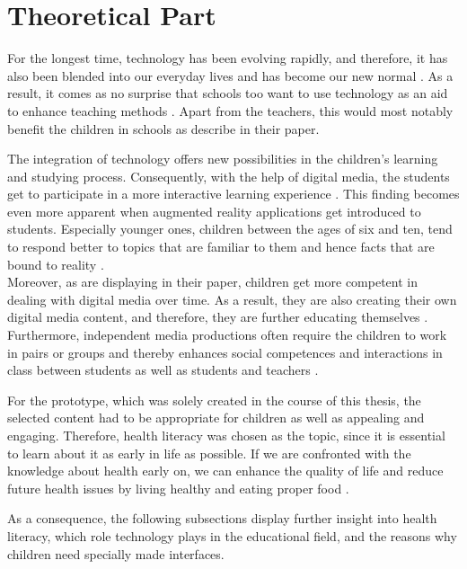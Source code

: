 \section{Theoretical Part}
\label{section:TheoreticalPart}
For the longest time, technology has been evolving rapidly, and therefore, it has also been blended into our everyday lives and has become our new normal \autocite{walker2000screen, sharmin2012effect}. As a result, it comes as no surprise that schools too want to use technology as an aid to enhance teaching methods \autocite{gan2015enhancing, lozano2016dedigitalizing}. Apart from the teachers, this would most notably benefit the children in schools as \textcite{gan2015enhancing} describe in their paper. 

The integration of technology offers new possibilities in the children's learning and studying process. Consequently, with the help of digital media, the students get to participate in a more interactive learning experience \autocite{gan2015enhancing}. This finding becomes even more apparent when augmented reality applications get introduced to students. Especially younger ones, children between the ages of six and ten, tend to respond better to topics that are familiar to them and hence facts that are bound to reality \autocite{gossen2012search, kermani2015preparing}.\\
Moreover, as \textcite{cabero2016educational} are displaying in their paper, children get more competent in dealing with digital media over time. As a result, they are also creating their own digital media content, and therefore, they are further educating themselves \autocite{cabero2016educational}. Furthermore, independent media productions often require the children to work in pairs or groups and thereby enhances social competences and interactions in class between students as well as students and teachers \autocite{cabero2016educational}. 

For the prototype, which was solely created in the course of this thesis, the selected content had to be appropriate for children as well as appealing and engaging. Therefore, health literacy was chosen as the topic, since it is essential to learn about it as early in life as possible. If we are confronted with the knowledge about health early on, we can enhance the quality of life and reduce future health issues by living healthy and eating proper food \autocite{velardo2017emphasizing}.

As a consequence, the following subsections display further insight into health literacy, which role technology plays in the educational field, and the reasons why children need specially made interfaces.

